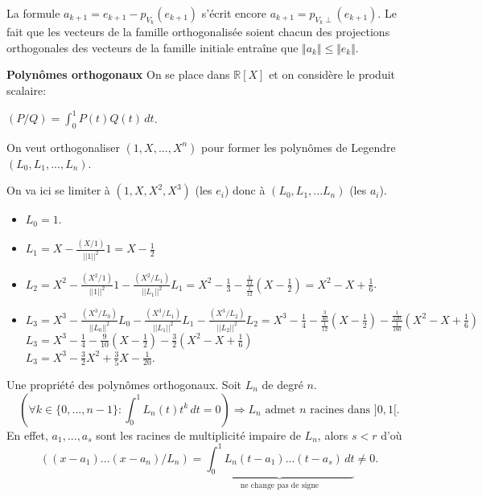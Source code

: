 \begin{rem}
 La formule $a_{k+1} = e_{k+1} - p_{V_{k}}(e_{k+1})$ s'écrit encore $a_{k+1} = p_{V_{k}\perp}(e_{k+1})$. Le fait que les vecteurs de la famille orthogonalisée soient chacun des projections orthogonales des vecteurs de la famille initiale entraîne que $\Vert a_k\Vert \leq \Vert e_k\Vert$.
\end{rem}


\begin{exple}
\textbf{Polynômes orthogonaux}
On se place dans $\mathbb{R}[X]$ et on considère le produit scalaire:

\begin{center}
$(P/Q) = \displaystyle \int_{0}^{1} P(t)Q(t) \, dt$.
\end{center}

On veut orthogonaliser $(1, X, ..., X^{n})$ pour former les polynômes de Legendre $(L_0, L_1, ..., L_n)$.

On va ici se limiter à $(1, X, X^2, X^3)$ (les $e_i$) donc à $(L_0, L_1, ... L_n)$ (les $a_i$).
\begin{itemize}
\item $L_0 = 1$.\medskip
\item $L_1 = \displaystyle X - \frac{ (X/1) }{ ||1||^2 } 1 = X - \frac{1}{2}$
\item $L_2 = \displaystyle X^2 - \frac{ (X^2/1) }{ ||1||^2 } 1 - \frac{ (X^2/L_1) }{ ||L_1||^2 } L_1 = X^2 - \frac{1}{3} - \frac{\frac{1}{12}}{\frac{1}{12}} \left( X - \frac{1}{2} \right) = X^2 - X + \frac{1}{6}$.\medskip
\item $L_3 = \displaystyle X^3 - \frac{(X^3/L_0)}{||L_0||^2} L_0 - \frac{ (X^3/L_1) }{ ||L_1||^2 } L_1 - \frac{ (X^3/L_2) }{ ||L_2||^2 } L_2 = X^3 - \frac{1}{4} - \frac{\frac{3}{40}}{\frac{1}{12}} \left( X - \frac{1}{2} \right) - \frac{\frac{1}{120}}{\frac{1}{180}} \left( X^2 - X + \frac{1}{6} \right)$ \\
$L_3 = X^3 - \frac{1}{4} - \frac{9}{10} \left( X - \frac{1}{2} \right) - \frac{3}{2} \left( X^2 - X + \frac{1}{6} \right)$ \medskip\\
$L_3 = X^3 - \frac{3}{2} X^2 + \frac{3}{5} X - \frac{1}{20}$.\medskip
\end{itemize}
\begin{rem}
 Une propriété des polynômes orthogonaux. 
Soit $L_n$ de degré $n$. 
\[
\left(  \forall k \in \{0, ..., n-1\} : \displaystyle \int_{0}^{1} L_{n}(t) t^{k} \, dt = 0 \right) \Rightarrow
L_n \text{ admet $n$ racines dans $]0,1[$.}
\]
En effet, $a_1, ..., a_s$ sont les racines de multiplicité impaire de $L_n$, alors $s < r$ d'où 
\[
\left( (x-a_1) ... (x-a_n) / L_n \right) = \displaystyle \underset{\textrm{ne change pas de signe}}{\underbrace{\int_{0}^{1} L_n(t-a_1)...(t-a_s) \, dt}} \neq 0.
\]
\end{rem}

\end{exple}


